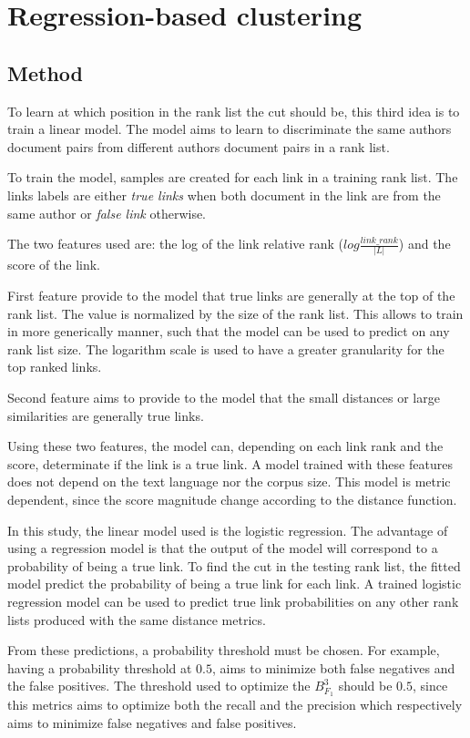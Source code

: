 \section{Regression-based clustering\label{sec:regression_based_clustering}}

\subsection{Method}

To learn at which position in the rank list the cut should be, this third idea is to train a linear model.
The model aims to learn to discriminate the same authors document pairs from different authors document pairs in a rank list.

To train the model, samples are created for each link in a training rank list.
The links labels are either \textit{true links} when both document in the link are from the same author or \textit{false link} otherwise.

The two features used are: the log of the link relative rank ($log \frac{link\_rank}{|L|}$) and the score of the link.

First feature provide to the model that true links are generally at the top of the rank list.
The value is normalized by the size of the rank list.
This allows to train in more generically manner, such that the model can be used to predict on any rank list size.
The logarithm scale is used to have a greater granularity for the top ranked links.

Second feature aims to provide to the model that the small distances or large similarities are generally true links.

Using these two features, the model can, depending on each link rank and the score, determinate if the link is a true link.
A model trained with these features does not depend on the text language nor the corpus size.
This model is metric dependent, since the score magnitude change according to the distance function.

In this study, the linear model used is the logistic regression.
The advantage of using a regression model is that the output of the model will correspond to a probability of being a true link.
To find the cut in the testing rank list, the fitted model predict the probability of being a true link for each link.
A trained logistic regression model can be used to predict true link probabilities on any other rank lists produced with the same distance metrics.

From these predictions, a probability threshold must be chosen.
For example, having a probability threshold at $0.5$, aims to minimize both false negatives and the false positives.
The threshold used to optimize the $B^3_{F_1}$ should be $0.5$, since this metrics aims to optimize both the recall and the precision which respectively aims to minimize false negatives and false positives.

